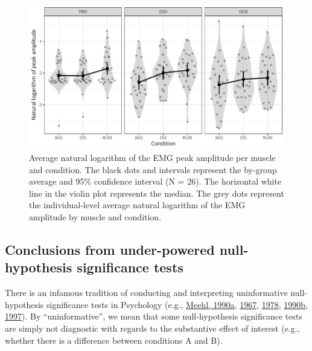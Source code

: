 \documentclass[
  man, donotrepeattitle,floatsintext]{apa6}
\begin{document}
\begin{figure}[!htb]

{\centering \includegraphics[width=1\linewidth]{manuscript_files/figure-latex/general-1} 

}

\caption{Average natural logarithm of the EMG peak amplitude per muscle and condition. The black dots and intervals represent the by-group average and 95\% confidence interval (N = 26). The horizontal white line in the violin plot represents the median. The grey dots represent the individual-level average natural logarithm of the EMG amplitude by muscle and condition.}\label{fig:general}
\end{figure}

\hypertarget{conclusions-from-under-powered-null-hypothesis-significance-tests}{%
\subsection{Conclusions from under-powered null-hypothesis significance tests}\label{conclusions-from-under-powered-null-hypothesis-significance-tests}}

There is an infamous tradition of conducting and interpreting uninformative null-hypothesis significance tests in Psychology (e.g., \protect\hyperlink{ref-meehl_appraising_1990-1}{Meehl, 1990a}, \protect\hyperlink{ref-meehl_theory-testing_1967}{1967}, \protect\hyperlink{ref-meehl_theoretical_1978}{1978}, \protect\hyperlink{ref-meehl_why_1990}{1990b}, \protect\hyperlink{ref-harlow_problem_1997}{1997}). By ``uninformative'', we mean that some null-hypothesis significance tests are simply not diagnostic with regards to the substantive effect of interest (e.g., whether there is a difference between conditions A and B).
\end{document}
